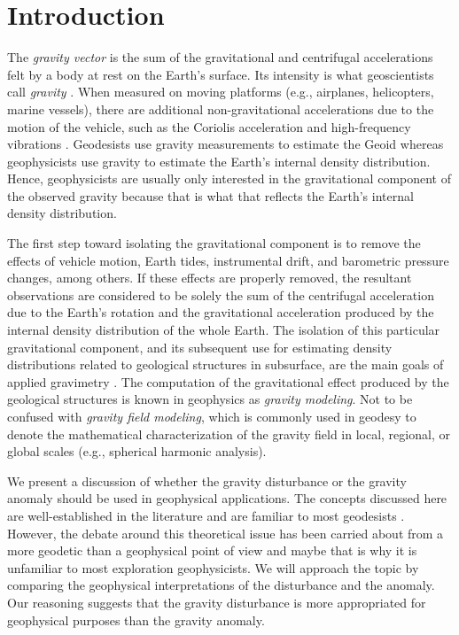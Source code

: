 \documentclass[manuscript]{geophysics}
\begin{document}
\section{Introduction}

The \textit{gravity vector} is the sum of the gravitational and centrifugal
accelerations felt by a body at rest on the Earth's surface.
Its intensity is what geoscientists call \textit{gravity}
\citep{heiskanen-moritz1967, hofmann-wellenhof-moritz2005}.
When measured on moving platforms (e.g., airplanes,
helicopters, marine vessels), there are additional
non-gravitational accelerations due to the motion of the vehicle,
such as the Coriolis acceleration and high-frequency vibrations
\citep{glennie-etal2000,nabighian-etal2005-grav,baumann-etal2012}.
Geodesists use gravity measurements to estimate the Geoid \citep{li2001}
whereas geophysicists use gravity to estimate the Earth's
internal density distribution.
Hence, geophysicists are usually only interested
in the gravitational component of the observed gravity
because that is what that reflects the Earth's internal density distribution.

The first step toward isolating the gravitational component
is to remove the effects of vehicle motion, Earth tides, instrumental drift,
and barometric pressure changes, among others.
If these effects are properly removed,
the resultant observations are considered to be solely
the sum of the centrifugal acceleration due to the Earth's rotation and
the gravitational acceleration produced by
the internal density distribution of the whole Earth.
The isolation of this particular gravitational component,
and its subsequent use for estimating density
distributions related to geological structures in subsurface,
are the main goals of applied gravimetry \citep{blakely1996}.
The computation of the gravitational effect produced by
the geological structures is known in geophysics as
\textit{gravity modeling}.
Not to be confused with \textit{gravity field modeling}, which
is commonly used in geodesy to denote the mathematical characterization of the
gravity field in local, regional, or global scales (e.g., spherical harmonic
analysis).

We present a discussion of whether the gravity disturbance or the gravity
anomaly should be used in geophysical applications.
The concepts discussed here are well-established in the literature and
are familiar to most geodesists \citep{vajda-etal2006, vajda-etal2007, vajda-etal2008}.
However, the debate around this theoretical issue has been
carried about from a more geodetic than a geophysical point of view
\citep{lafehr1991,chapin1996,li2001,fairhead2003,
hackney-featherstone2003,hinze2005} and maybe that is why it is
unfamiliar to most exploration geophysicists.
We will approach the topic by comparing the geophysical interpretations of the
disturbance and the anomaly.
Our reasoning suggests that the gravity disturbance is more appropriated for
geophysical purposes than the gravity anomaly.
\end{document}
